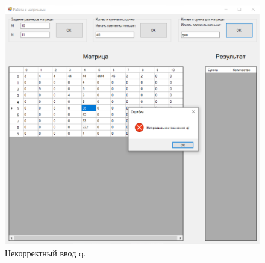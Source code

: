 \documentclass[a4paper,12pt]{article}
\theoremstyle{plain}
\theoremstyle{remark}
\theoremstyle{definition}
\begin{document}
	\begin{figure}[h!]
		\centering
		\includegraphics[width=.9\linewidth]{6.png}
		\caption{Некорректный ввод q.}
	\end{figure}
	
	
\end{document}
